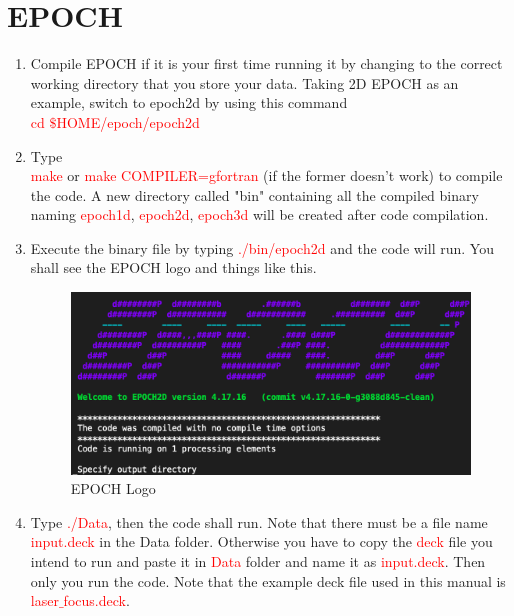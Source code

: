 \documentclass{article}
\begin{document}
\section{EPOCH}
\begin{enumerate}
    \item Compile EPOCH if it is your first time running it by changing to the correct working directory that you store your data. Taking 2D EPOCH as an example, switch to epoch2d by using this command \\
    \textcolor{red}{cd $\$$HOME/epoch/epoch2d} \\
    \item Type\\
    \textcolor{red}{make} or \textcolor{red}{make COMPILER=gfortran} (if the former doesn't work) to compile the code. A new directory called "bin" containing all the compiled binary naming \textcolor{red}{epoch1d}, \textcolor{red}{epoch2d}, \textcolor{red}{epoch3d} will be created after code compilation.\\
    \item Execute the binary file by typing \textcolor{red}{./bin/epoch2d} and the code will run. You shall see the EPOCH logo and things like this.

\begin{figure}[htp]
    \centering
    \includegraphics[scale=0.3]{EPOCH.png}
    \caption{EPOCH Logo}
\end{figure}

\item Type \textcolor{red}{./Data}, then the code shall run. Note that there must be a file name \textcolor{red}{input.deck} in the Data folder. Otherwise you have to copy the \textcolor{red}{deck} file you intend to run and paste it in \textcolor{red}{Data} folder and name it as \textcolor{red}{input.deck}. Then only you run the code. Note that the example deck file used in this manual is \textcolor{red}{laser$\_$focus.deck}.
\end{enumerate}
\end{document}
